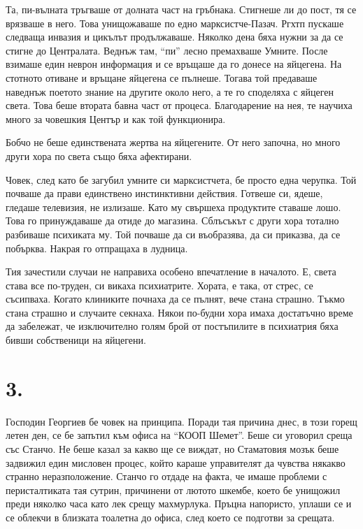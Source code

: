 \documentclass[ebook,openany,12pt]{memoir}
\begin{document}
Та, пи-вълната тръгваше от долната част на гръбнака. Стигнеше ли до пост, тя се врязваше в него. Това унищожаваше по едно марксистче-Пазач. Ргхтп пускаше следваща инвазия и цикълът продължаваше. Няколко дена бяха нужни за да се стигне до Централата. Веднъж там, ``пи'' лесно премахваше Умните. После взимаше един неврон информация и се връщаше да го донесе на яйцегена. На стотното отиване и връщане яйцегена се пълнеше. Тогава той предаваше наведнъж поетото знание на другите около него, а те го споделяха с яйцеген света. Това беше втората бавна част от процеса. Благодарение на нея, те научиха много за човешкия Център и как той функционира. 

Бобчо не беше единствената жертва на яйцегените. От него започна, но много други хора по света също бяха афектирани.

Човек, след като бе загубил умните си марксистчета, бе просто една черупка. Той почваше да прави единствено инстинктивни действия. Готвеше си, ядеше, гледаше телевизия, не излизаше. Като му свършеха продуктите ставаше лошо. Това го принуждаваше да отиде до магазина. Сблъсъкът с други хора тотално разбиваше психиката му. Той почваше да си въобразява, да си приказва, да се побърква. Накрая го отпращаха в лудница. 

Тия зачестили случаи не направиха особено впечатление в началото. Е, света става все по-труден, си викаха психиатрите. Хората, е така, от стрес, се съсипваха. Когато клиниките почнаха да се пълнят, вече стана страшно. Тъкмо стана страшно и случаите секнаха. Някои по-будни хора имаха достатъчно време да забележат, че изключително голям брой от постъпилите в психиатрия бяха бивши собственици на яйцегени.

\section*{3.}

Господин Георгиев бе човек на принципа. Поради тая причина днес, в този горещ летен ден, се бе запътил към офиса на ``КООП Шемет''. Беше си уговорил среща със Станчо. Не беше казал за какво ще се виждат, но Стаматовия мозък беше задвижил един мисловен процес, който караше управителят да чувства някакво странно неразположение. Станчо го отдаде на факта, че имаше проблеми с перисталтиката тая сутрин, причинени от лютото шкембе, което бе унищожил преди няколко часа като лек срещу махмурлука. Пръцна напористо, уплаши се и се облекчи в близката тоалетна до офиса, след което се подготви за срещата.
\end{document}

